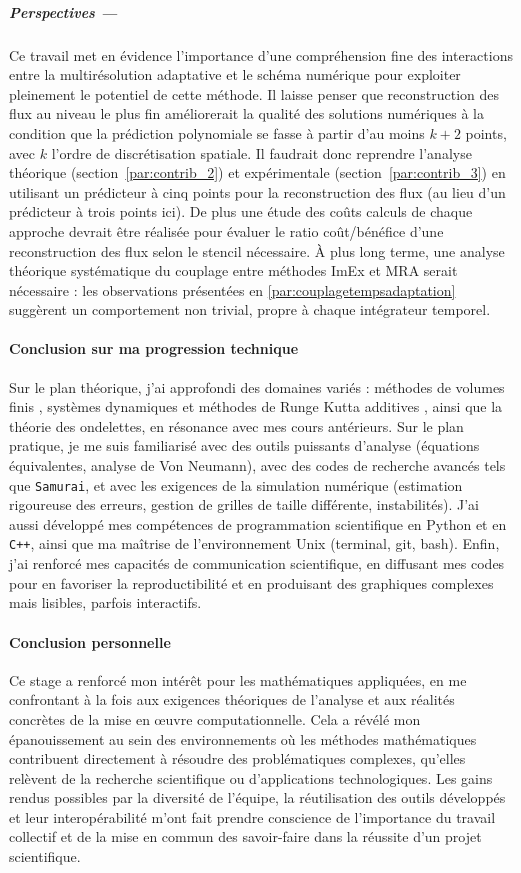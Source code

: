 \medskip
\subparagraph*{Perspectives —}  
Ce travail met en évidence l'importance d'une compréhension fine des interactions 
entre la multirésolution adaptative et le schéma numérique pour exploiter pleinement le potentiel de cette méthode.  
Il laisse penser que reconstruction des flux au niveau le plus fin améliorerait la qualité des solutions numériques à la condition que la prédiction polynomiale 
se fasse à partir d'au moins \(k+2\) points, avec \(k\) l'ordre de discrétisation spatiale.
Il faudrait donc reprendre l'analyse théorique (section~\ref{par:contrib_2}) 
et expérimentale (section~\ref{par:contrib_3}) en utilisant un prédicteur à cinq points pour la reconstruction des flux (au lieu d'un prédicteur à trois points ici).
De plus une étude des coûts calculs de chaque approche devrait être réalisée
pour évaluer le ratio coût/bénéfice d'une reconstruction des flux selon le stencil nécessaire.
À plus long terme, une analyse théorique systématique du couplage entre méthodes ImEx et MRA serait nécessaire : les observations présentées en \ref{par:couplagetempsadaptation} suggèrent un comportement non trivial, propre à chaque intégrateur temporel.

\paragraph*{Conclusion sur ma progression technique}\label{par:cc2}
Sur le plan théorique, j'ai approfondi des domaines variés : méthodes de volumes finis \cite{LeVeque1990}, systèmes dynamiques et méthodes de Runge Kutta additives \cite{HairerAndWanner1}, ainsi que la théorie des ondelettes, en résonance avec mes cours antérieurs.
Sur le plan pratique, je me suis familiarisé avec des outils puissants d'analyse (équations équivalentes, analyse de Von Neumann), avec des codes de recherche avancés tels que \texttt{Samurai}, et avec les exigences de la simulation numérique (estimation rigoureuse des erreurs, gestion de grilles de taille différente, instabilités).
J'ai aussi développé mes compétences de programmation scientifique en Python et en \texttt{C++}, ainsi que ma maîtrise de l'environnement Unix (terminal, git, bash).
Enfin, j'ai renforcé mes capacités de communication scientifique, en diffusant mes codes pour en favoriser la reproductibilité et en produisant des graphiques complexes mais lisibles, parfois interactifs.
\paragraph*{Conclusion personnelle}\label{par:cc3}
Ce stage a renforcé mon intérêt pour les mathématiques appliquées, 
en me confrontant à la fois aux exigences théoriques de l'analyse et aux réalités concrètes de la mise en œuvre computationnelle.
Cela a révélé mon épanouissement au sein des environnements où les méthodes mathématiques contribuent directement à résoudre des problématiques complexes, 
qu'elles relèvent de la recherche scientifique ou d'applications technologiques.
Les gains rendus possibles par la diversité de l'équipe, 
la réutilisation des outils développés et leur interopérabilité m'ont fait prendre conscience
de l'importance du travail collectif et de la mise en commun des savoir-faire dans la réussite d'un projet scientifique.
